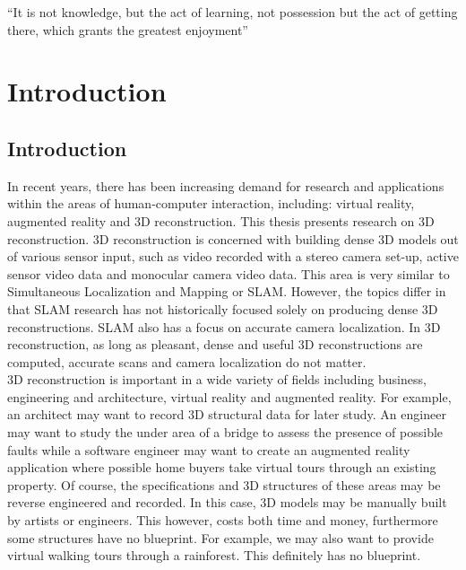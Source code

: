 \begin{savequote}[8cm]
  ``It is not knowledge, but the act of learning, not possession but the act of getting there, which grants the greatest enjoyment''
\end{savequote}
\makeatletter
\chapter{Introduction}



\section{Introduction}

In recent years, there has been increasing demand for research and applications within the areas of human-computer interaction, including: virtual reality, augmented reality and 3D reconstruction. This thesis presents research on 3D reconstruction. 3D reconstruction is concerned with building dense 3D models out of various sensor input, such as video recorded with a stereo camera set-up, active sensor video data and monocular camera video data. This area is very similar to Simultaneous Localization and Mapping or SLAM. However, the topics differ in that SLAM research has not historically focused solely on producing dense 3D reconstructions. SLAM also has a focus on accurate camera localization. In 3D reconstruction, as long as pleasant, dense and useful 3D reconstructions are computed, accurate scans and camera localization do not matter. \\

3D reconstruction is important in a wide variety of fields including business, engineering and architecture, virtual reality and augmented reality. For example, an architect may want to record 3D structural data for later study. An engineer may want to study the under area of a bridge to assess the presence of possible faults while a software engineer may want to create an augmented reality application where possible home buyers take virtual tours through an existing property. Of course, the specifications and 3D structures of these areas may be reverse engineered and recorded. In this case, 3D models may be manually built by artists or engineers. This however, costs both time and money, furthermore some structures have no blueprint. For example, we may also want to provide virtual walking tours through a rainforest. This definitely has no blueprint. \\


